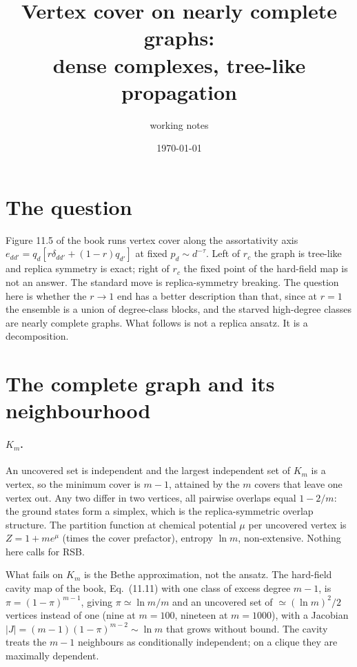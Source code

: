 \documentclass[11pt]{article}
\title{Vertex cover on nearly complete graphs:\\ dense complexes, tree-like propagation}
\author{working notes}
\date{\today}
\begin{document}
\maketitle

\section{The question}

Figure 11.5 of the book runs vertex cover along the assortativity axis
$e_{dd'}=q_d[r\delta_{dd'}+(1-r)q_{d'}]$ at fixed $p_d\sim d^{-\tau}$. Left of
$r_c$ the graph is tree-like and replica symmetry is exact; right of $r_c$ the
fixed point of the hard-field map is not an answer. The standard move is
replica-symmetry breaking. The question here is whether the $r\to1$ end has a
better description than that, since at $r=1$ the ensemble is a union of
degree-class blocks, and the starved high-degree classes are nearly complete
graphs. What follows is not a replica ansatz. It is a decomposition.

\section{The complete graph and its neighbourhood}

\paragraph{$K_m$.} An uncovered set is independent and the largest independent
set of $K_m$ is a vertex, so the minimum cover is $m-1$, attained by the $m$
covers that leave one vertex out. Any two differ in two vertices, all pairwise
overlaps equal $1-2/m$: the ground states form a simplex, which is the
replica-symmetric overlap structure. The partition function at chemical
potential $\mu$ per uncovered vertex is $Z=1+m e^{\mu}$ (times the cover
prefactor), entropy $\ln m$, non-extensive. Nothing here calls for RSB.

What fails on $K_m$ is the Bethe approximation, not the ansatz. The hard-field
cavity map of the book, Eq.~(11.11) with one class of excess degree $m-1$, is
$\pi=(1-\pi)^{m-1}$, giving $\pi\simeq\ln m/m$ and an uncovered set of
$\simeq(\ln m)^2/2$ vertices instead of one (nine at $m=100$, nineteen at
$m=1000$), with a Jacobian $|J|=(m-1)(1-\pi)^{m-2}\sim\ln m$ that grows without
bound. The cavity treats the $m-1$ neighbours as conditionally independent; on
a clique they are maximally dependent.
\end{document}
